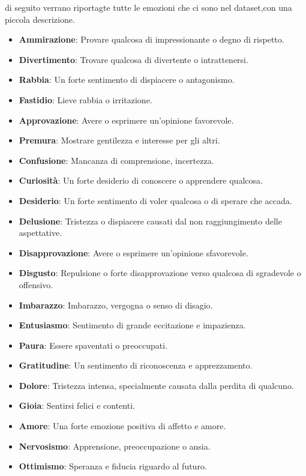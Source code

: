 \documentclass{article}
\begin{document}
di seguito verrano riportagte tutte le emozioni che ci sono nel dataset,con una piccola descrizione.
\begin{itemize}
    \item \textbf{Ammirazione}: Provare qualcosa di impressionante o degno di rispetto.
    \item \textbf{Divertimento}: Trovare qualcosa di divertente o intrattenersi.
    \item \textbf{Rabbia}: Un forte sentimento di dispiacere o antagonismo.
    \item \textbf{Fastidio}: Lieve rabbia o irritazione.
    \item \textbf{Approvazione}: Avere o esprimere un'opinione favorevole.
    \item \textbf{Premura}: Mostrare gentilezza e interesse per gli altri.
    \item \textbf{Confusione}: Mancanza di comprensione, incertezza.
    \item \textbf{Curiosità}: Un forte desiderio di conoscere o apprendere qualcosa.
    \item \textbf{Desiderio}: Un forte sentimento di voler qualcosa o di sperare che accada.
    \item \textbf{Delusione}: Tristezza o dispiacere causati dal non raggiungimento delle aspettative.
    \item \textbf{Disapprovazione}: Avere o esprimere un'opinione sfavorevole.
    \item \textbf{Disgusto}: Repulsione o forte disapprovazione verso qualcosa di sgradevole o offensivo.
    \item \textbf{Imbarazzo}: Imbarazzo, vergogna o senso di disagio.
    \item \textbf{Entusiasmo}: Sentimento di grande eccitazione e impazienza.
    \item \textbf{Paura}: Essere spaventati o preoccupati.
    \item \textbf{Gratitudine}: Un sentimento di riconoscenza e apprezzamento.
    \item \textbf{Dolore}: Tristezza intensa, specialmente causata dalla perdita di qualcuno.
    \item \textbf{Gioia}: Sentirsi felici e contenti.
    \item \textbf{Amore}: Una forte emozione positiva di affetto e amore.
    \item \textbf{Nervosismo}: Apprensione, preoccupazione o ansia.
    \item \textbf{Ottimismo}: Speranza e fiducia riguardo al futuro.

\end{itemize}
\end{document}
